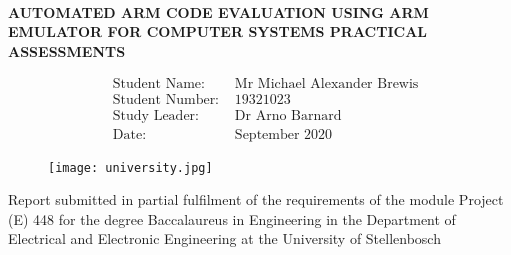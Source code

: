 \begin{titlepage}

\begin{center}
\Large\textbf{\\\MakeUppercase{Automated ARM code evaluation
using ARM emulator for Computer
Systems practical assessments}}\par
\end{center}

\Large
\begin{center}
\begin{align*}
&\text{Student Name: } & \text{Mr Michael Alexander Brewis}\\
&\text{Student Number: } & \text{19321023}\\
&\text{Study Leader:} & \text{Dr Arno Barnard}\\
&\text{Date:} & \text{September 2020}
\end{align*}
\end{center}

\begin{figure}[H]
	\begin{center}
	\texttt{[image: university.jpg]}
	\end{center}	
\end{figure}
\Large

\vfill
\begin{center}
Report submitted in partial fulfilment of the requirements of the module Project (E) 448 for the degree Baccalaureus in Engineering in the Department of Electrical and Electronic Engineering at the University of Stellenbosch
\end{center}	
\end{titlepage}